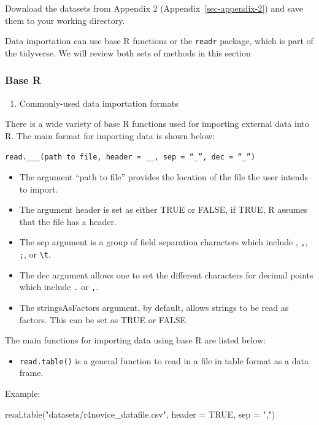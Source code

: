 \documentclass[
  letterpaper,
  DIV=11,
  numbers=noendperiod]{scrreprt}
\newenvironment{Shaded}{}{}
\newcommand{\AttributeTok}[1]{\textcolor[rgb]{0.84,0.23,0.29}{#1}}
\newcommand{\ConstantTok}[1]{\textcolor[rgb]{0.00,0.36,0.77}{#1}}
\newcommand{\FunctionTok}[1]{\textcolor[rgb]{0.44,0.26,0.76}{#1}}
\newcommand{\NormalTok}[1]{\textcolor[rgb]{0.14,0.16,0.18}{#1}}
\newcommand{\StringTok}[1]{\textcolor[rgb]{0.01,0.18,0.38}{#1}}
\providecommand{\tightlist}{%
  \setlength{\itemsep}{0pt}\setlength{\parskip}{0pt}}\usepackage{longtable,booktabs,array}
\begin{document}
Download the datasets from Appendix 2 (Appendix~\ref{sec-appendix-2})
and save them to your working directory.

Data importation can use base R functions or the \texttt{readr} package,
which is part of the tidyverse. We will review both sets of methods in
this section

\subsubsection{Base R}\label{base-r}

\begin{enumerate}
\def\labelenumi{\arabic{enumi}.}
\tightlist
\item
  Commonly-used data importation formats
\end{enumerate}

There is a wide variety of base R functions used for importing external
data into R. The main format for importing data is shown below:

\texttt{read.\_\_\_(path\ to\ file,\ header\ =\ \_\_,\ sep\ =\ “\_”,\ dec\ =\ “\_”)}

\begin{itemize}
\item
  The argument ``path to file'' provides the location of the file the
  user intends to import.
\item
  The argument header is set as either TRUE or FALSE, if TRUE, R assumes
  that the file has a header.
\item
  The sep argument is a group of field separation characters which
  include , \texttt{,}, \texttt{;}, or \texttt{\textbackslash{}t}.
\item
  The dec argument allows one to set the different characters for
  decimal points which include \texttt{.} or \texttt{,}.
\item
  The stringsAsFactors argument, by default, allows strings to be read
  as factors. This can be set as TRUE or FALSE
\end{itemize}

The main functions for importing data using base R are listed below:

\begin{itemize}
\tightlist
\item
  \texttt{read.table()} is a general function to read in a file in table
  format as a data frame.
\end{itemize}

Example:

\begin{Shaded}
\begin{Highlighting}[]
\FunctionTok{read.table}\NormalTok{(}\StringTok{"datasets/r4novice\_datafile.csv"}\NormalTok{, }\AttributeTok{header =} \ConstantTok{TRUE}\NormalTok{, }\AttributeTok{sep =} \StringTok{","}\NormalTok{)}
\end{Highlighting}
\end{Shaded}
\end{document}
